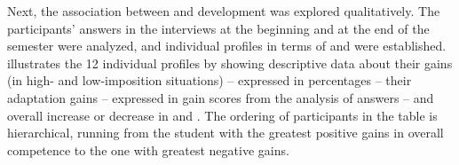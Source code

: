 \documentclass[output=paper]{langsci/langscibook}
\begin{document}
Next, the association between  and  development was explored qualitatively. The participants’ answers in the interviews at the beginning and at the end of the semester were analyzed, and individual profiles in terms of  and  were established.  illustrates the 12 individual profiles by showing descriptive data about their  gains (in high- and low-imposition situations) – expressed in percentages – their  adaptation gains – expressed in gain scores from the analysis of  answers – and overall increase or decrease in  and . The ordering of participants in the table is hierarchical, running from the student with the greatest positive gains in overall  competence to the one with greatest negative gains.
\end{document}
